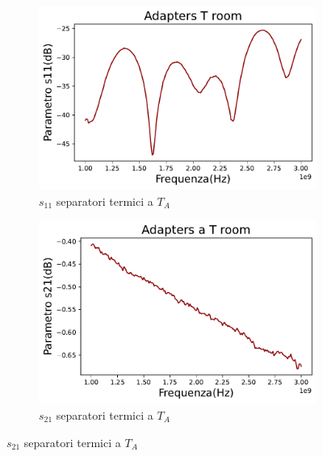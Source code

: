\begin{figure}[H]
\centering

\begin{subfigure}{0.49\textwidth}
	\includegraphics[width=\textwidth]{S11_TA.pdf}
    \caption{$s_{11}$ separatori termici a $T_{A}$}
    \label{fig:sub1}
\end{subfigure}
\hfill
\begin{subfigure}{0.49\textwidth}
    \includegraphics[width=\textwidth]{S21_TA.pdf}
    \caption{$s_{21}$ separatori termici a $T_{A}$}
    \label{fig:sub2}
\end{subfigure}

\end{figure}

